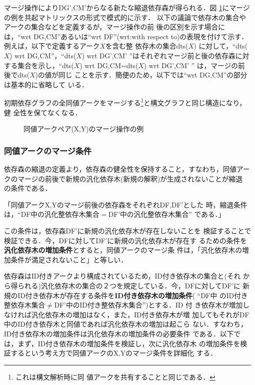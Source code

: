 マージ操作によりDG',CM'からなる新たな縮退依存森が得られる．図
\ref{fig:ArcMerge}にマージの例を共起マトリックスの形式で模式的に示す．
以下の議論で依存木の集合やアークの集合などを定義するが，マージ操作の前
後の区別を示す場合には，``wrt DG,CM''あるいは``wrt DF''(wrt:with
respect to)の表現を付けて示す．例えば，以下で定義するアーク$X$を含む整
依存木の集合dts($X$) に対して，``dts($X$) wrt DG,CM''，``dts($X$) wrt
DG',CM' ''はそれぞれマージ前と後の依存森に対する集合を示し，``dts($X$)
wrt DG,CM=dts($X$) wrt DG',CM' '' は，マージの前後でdts($X$)の値が同じ
ことを示す．簡便のため，以下では``wrt DG,CM''の部分は基本的に省略して
いる．

初期依存グラフの全同値アークをマージする\footnote{これは構文解析時に同
値アークを共有することと同じである．}と構文グラフと同じ構造になり，健
全性を保てなくなる．

\begin{figure}[b]
 \begin{center}
 \end{center}
\myfiglabelskip

\caption{同値アークペア(X,Y)のマージ操作の例}
\label{fig:ArcMerge}
\end{figure}


\subsubsection{同値アークのマージ条件}

依存森の縮退の定義より，依存森の健全性を保持すること，すなわち，同値アー
クのマージの前後で新規の汎化依存木(新規の解釈)が生成されないことが縮退
の条件である．

\mygapskip 
\mynoindent{\bf[同値アークのマージ条件]}

{\mynoindent}「同値アークX,Yのマージ前後の依存森をそれぞれDF,DF'とした
時，縮退条件は，``DF中の汎化整依存木集合$=$DF'中の汎化整依存木集合'' 
である．」{\mygapskip}

{\mynoindent}この条件は，依存森DF'に新規の汎化依存木が存在しないことを
検証することで検証できる．今，DFに対してDF'に新規の汎化依存木が存在す
るための条件を{\bf 汎化依存木の増加条件}とすると，同値アークのマージ条
件は，「汎化依存木の増加条件が満足されないこと」と等しい．

依存森はID付きアークより構成されているため，ID付き依存木の集合と(それ
から得られる)汎化依存木の集合の２つを規定している．今，DFに対してDF'に
新規のID付き依存木が存在する条件を{\bf ID付き依存木の増加条件}( ``DF中
のID付き整依存木集合${\neq}$DF'中のID付き整依存木集合'')とする．ID 付
き依存木が増加しなければ汎化依存木の増加はなく，また，ID付き依存木が増
加してもそれがDF中のID付き依存木と同値であれば汎化依存木の増加は起こら
ない．すなわち，ID付き依存木の増加条件は汎化依存木の増加条件の必要条件
である．以下では，まず，ID付き依存木の増加条件を検証し，次に汎化依存木
の増加条件を検証するという考え方で同値アークのX,Yのマージ条件を詳細化
する．

